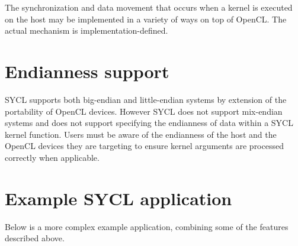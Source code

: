 The synchronization and data movement that occurs when a kernel is executed on
the host may be implemented in a variety of ways
on top of OpenCL. The actual mechanism is implementation-defined.

\section{Endianness support}

SYCL supports both big-endian and little-endian systems by extension of the portability of OpenCL devices. However SYCL does not support mix-endian systems and does not support specifying the endianness of data within a SYCL kernel function. Users must be aware of the endianness of the host and the OpenCL devices they are targeting to ensure kernel arguments are processed correctly when applicable.

\section{Example SYCL application}

Below is a more complex example application, combining some of the features
described above.





